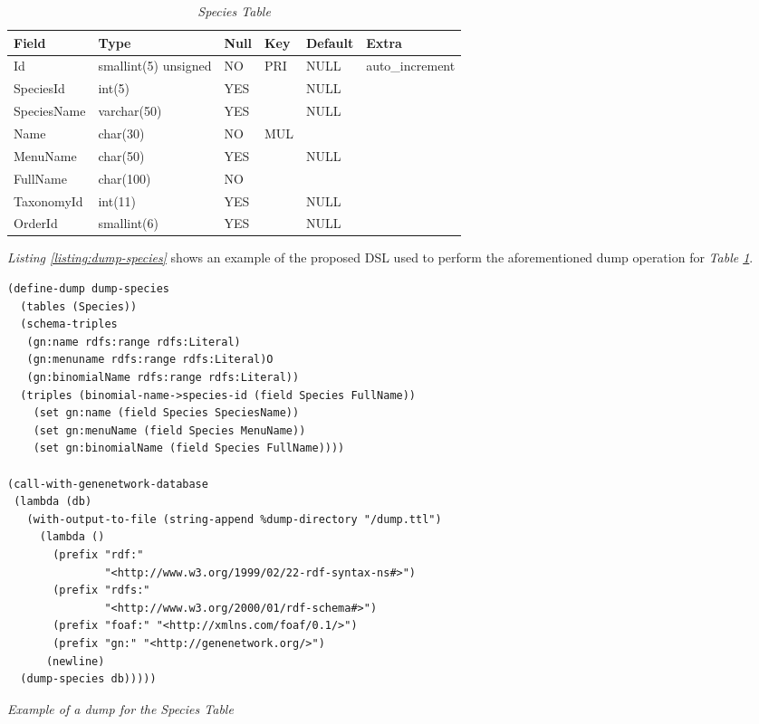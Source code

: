 \begin{table}[h!]
  \centering
  \begin{tabular}{llllll}
    Field & Type & Null & Key & Default & Extra\\
    \hline
    Id & smallint(5) unsigned & NO & PRI & NULL & auto\_increment\\
    SpeciesId & int(5) & YES &  & NULL & \\
    SpeciesName & varchar(50) & YES &  & NULL & \\
    Name & char(30) & NO & MUL &  & \\
    MenuName & char(50) & YES &  & NULL & \\
    FullName & char(100) & NO &  &  & \\
    TaxonomyId & int(11) & YES &  & NULL & \\
    OrderId & smallint(6) & YES &  & NULL & \\
    \hline
  \end{tabular}
  \caption{\textit{Species Table}}
  \label{table:species}
\end{table}

\textit{Listing \ref{listing:dump-species}} shows an example of the proposed DSL used to perform the aforementioned dump operation for \textit{Table \ref{table:species}}.

\begin{listing}[H]
\begin{verbatim}
(define-dump dump-species
  (tables (Species))
  (schema-triples
   (gn:name rdfs:range rdfs:Literal)
   (gn:menuname rdfs:range rdfs:Literal)O
   (gn:binomialName rdfs:range rdfs:Literal))
  (triples (binomial-name->species-id (field Species FullName))
    (set gn:name (field Species SpeciesName))
    (set gn:menuName (field Species MenuName))
    (set gn:binomialName (field Species FullName))))

(call-with-genenetwork-database
 (lambda (db)
   (with-output-to-file (string-append %dump-directory "/dump.ttl")
     (lambda ()
       (prefix "rdf:"
               "<http://www.w3.org/1999/02/22-rdf-syntax-ns#>")
       (prefix "rdfs:"
               "<http://www.w3.org/2000/01/rdf-schema#>")
       (prefix "foaf:" "<http://xmlns.com/foaf/0.1/>")
       (prefix "gn:" "<http://genenetwork.org/>") 
      (newline)
  (dump-species db)))))
\end{verbatim}
\caption{\textit{Example of a dump for the Species Table}}
\label{listing:dump-species}
\end{listing}

